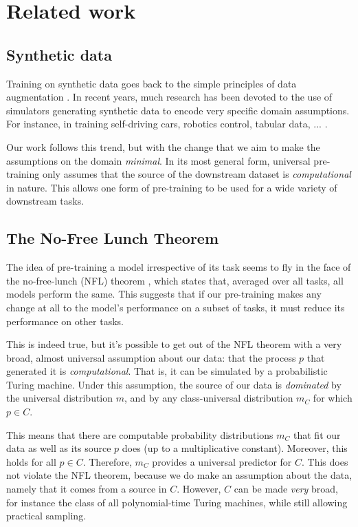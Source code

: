 \documentclass{article} %
\begin{document}
\section{Related work}

\subsection{Synthetic data}

Training on synthetic data goes back to the simple principles of data augmentation \cite{}. In recent years, much research has been devoted to the use of simulators generating synthetic data to encode very specific domain assumptions. For instance, in training self-driving cars, robotics control, tabular data, ... \cite{}.

Our work follows this trend, but with the change that we aim to make the assumptions on the domain \emph{minimal}. In its most general form, universal pre-training only assumes that the source of the downstream dataset is \emph{computational} in nature. This allows one form of pre-training to be used for a wide variety of downstream tasks.

\subsection{The No-Free Lunch Theorem}

The idea of pre-training a model irrespective of its task seems to fly in the face of the no-free-lunch (NFL) theorem \cite{}, which states that, averaged over all tasks, all models perform the same. This suggests that if our pre-training makes any change at all to the model's performance on a subset of tasks, it must reduce its performance on other tasks.

This is indeed true, but it's possible to get out of the NFL theorem with a very broad, almost universal assumption about our data: that the process $p$ that generated it is \emph{computational}. That is, it can be simulated by a probabilistic Turing machine. Under this assumption, the source of our data is \emph{dominated} by the universal distribution $m$, and by any class-universal distribution $m_C$ for which $p \in C$. 

This means that there are computable probability distributions $m_C$ that fit our data as well as its source $p$ does (up to a multiplicative constant). Moreover, this holds for all $p \in C$. Therefore, $m_C$ provides a universal predictor for $C$. This does not violate the NFL theorem, because we do make an assumption about the data, namely that it comes from a source in $C$. However, $C$ can be made \emph{very} broad, for instance the class of all polynomial-time Turing machines, while still allowing practical sampling.
\end{document}

